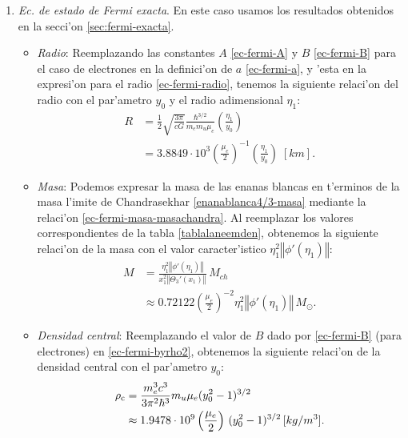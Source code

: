 \begin{enumerate}
\item \emph{Ec. de estado de Fermi exacta}. En este caso usamos los resultados obtenidos en la secci'on \eqref{sec:fermi-exacta}.
\begin{itemize}
\item \emph{Radio}: Reemplazando las constantes $A$ \eqref{ec-fermi-A} y $B$ \eqref{ec-fermi-B} para el caso de electrones en la definici'on de $a$ \eqref{ec-fermi-a}, y 'esta en la expresi'on para el radio \eqref{ec-fermi-radio}, tenemos la siguiente relaci'on del radio con el par'ametro $y_0$ y el radio adimensional $\eta_1$:
\begin{align}
R&=\frac{1}{2}\sqrt{\frac{3\pi}{cG}}\frac{\hbar^{3/2}}{ m_e m_u \mu_e}\left(\frac{\eta_1}{y_0}\right)\\
&=3.8849\cdot10^3\left(\frac{\mu_e}{2}\right)^{-1}\left(\frac{\eta_1}{y_0}\right)\;[km].\label{enanablanca-exacta-radio}
\end{align}
\item \emph{Masa}: Podemos expresar la masa de las enanas blancas en t'erminos de la masa l'imite de Chandrasekhar \eqref{enanablanca4/3-masa} mediante la relaci'on \eqref{ec-fermi-masa-masachandra}. Al reemplazar los valores correspondientes de la tabla \ref{tablalaneemden}, obtenemos la siguiente relaci'on de la masa con el valor caracter'istico $\eta_1^2\left\Vert\phi'(\eta_1)\right\Vert$:
\begin{align}
M&=\frac{\eta_1^2\left\Vert\phi'(\eta_1)\right\Vert}{x_1^2\left\Vert\Theta_3'(x_1)\right\Vert}\,M_{ch}\\
&\approx0.72122\left(\frac{\mu_e}{2}\right)^{-2}\eta_1^2\left\Vert\phi'(\eta_1)\right\Vert\, M_{\odot}.\label{enanablanca-exacta-masa}
\end{align}
\item \emph{Densidad central}: Reemplazando el valor de $B$ dado por \eqref{ec-fermi-B} (para electrones) en \eqref{ec-fermi-byrho2}, obtenemos la siguiente relaci'on de la densidad central con el par'ametro $y_0$:
\begin{align}
\rho_{\rm c}&=\frac{m_e^3 c^3}{3\pi^2\hbar^3}m_u\mu_e(y_0^2-1)^{3/2}\\
&\approx1.9478\cdot10^{9}\left(\frac{\mu_e}{2}\right)\,(y_0^2-1)^{3/2}\,[kg/m^3].\label{enanablanca-exacta-densidad}
\end{align}
\end{itemize}


\end{enumerate}

